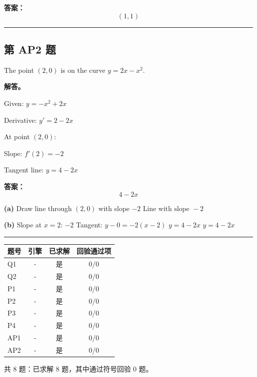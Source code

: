 \documentclass[12pt, a4paper]{article}
\newcommand{\problem}[1]{\subsection*{第 #1 题}}
\newcommand{\solution}{\textbf{解答。}}
\begin{document}
\textbf{答案：}
\[\boxed{(1, 1)}\]

\vspace{0.8em}
\hrule
\vspace{0.8em}

\problem{AP2}

The point $(2, 0)$ is on the curve $y = 2x - x^2$.

\solution

Given: $y = - x^{2} + 2 x$

Derivative: $y' = 2 - 2 x$

At point $(2, 0)$:

Slope: $f'(2) = -2$

Tangent line: $y = 4 - 2 x$

\textbf{答案：}
\[\boxed{4 - 2 x}\]

\textbf{(a)}
Draw line through $(2, 0)$ with slope $-2$
$\boxed{\text{Line with slope } -2}$

\textbf{(b)}
Slope at $x=2$: $-2$
Tangent: $y - 0 = -2(x - 2)$
$y = 4 - 2 x$
$\boxed{y = 4 - 2 x}$

\vspace{0.8em}
\hrule
\vspace{0.8em}

\begin{center}
\begin{tabular}{@{}lccc@{}}
\toprule
题号 & 引擎 & 已求解 & 回验通过项 \\
\midrule
    Q1 & - & 是 & 0/0 \\
    Q2 & - & 是 & 0/0 \\
    P1 & - & 是 & 0/0 \\
    P2 & - & 是 & 0/0 \\
    P3 & - & 是 & 0/0 \\
    P4 & - & 是 & 0/0 \\
    AP1 & - & 是 & 0/0 \\
    AP2 & - & 是 & 0/0 \\
\bottomrule
\end{tabular}
\end{center}

\noindent 共 8 题：已求解 8 题，其中通过符号回验 0 题。
\end{document}
